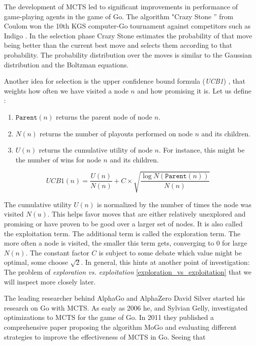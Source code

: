 The development of MCTS led to significant improvements in performance of game-playing agents in the game of Go. The algorithm "Crazy Stone '' from Coulom won the 10th KGS computer-Go tournament against competitors such as Indigo \cite{bouzy_associating_2006}. In the selection phase Crazy Stone estimates the probability of that move being better than the current best move and selects them according to that probability. The probability distribution over the moves is similar to the Gaussian distribution and the Boltzman equations. \cite[p. 4]{coulom_efficient_2007}

Another idea for selection is the upper confidence bound formula (\textit{UCB1}) \cite{auer_finite-time_nodate}, that weights how often we have visited a node $n$ and how promising it is. Let us define \cite[cf. p. 328]{russell_artificial_2021}:

\begin{enumerate}
    \item $\texttt{Parent}(n)$ returns the parent node of node $n$.
    \item $N(n) $ returns the number of playouts performed on node $n$ and its children.
    \item $U(n) $ returns the cumulative utility of node $n$. For instance, this might be the number of wins for node $n$ and its children.
\end{enumerate}

\begin{equation}
    \textit{UCB1}(n) = \frac{U(n)}{N(n)} + C \times \sqrt{\frac{\log{N(\texttt{Parent}(n))}}{N(n)}}
\end{equation}

The cumulative utility $U(n)$ is normalized by the number of times the node was visited $N(u)$. This helps favor moves that are either relatively unexplored and promising or have proven to be good over a larger set of nodes. It is also called the exploitation term. The additional term is called the exploration term. The more often a node is visited, the smaller this term gets, converging to 0 for large $N(n)$. The constant factor $C$ is subject to some debate which value might be optimal, some choose $\sqrt{2}$. In general, this hints at another point of investigation: The problem of \textit{exploration vs. exploitation} \ref{exploration_vs_exploitation} that we will inspect more closely later.

The leading researcher behind AlphaGo and AlphaZero David Silver started his research on Go with MCTS. As early as 2006 he, and Sylvian Gelly, investigated optimizations to MCTS \cite{gelly_achieving_nodate} for the game of Go. In 2011 they published a comprehensive paper \cite{gelly_monte-carlo_2011} proposing the algorithm MoGo and evaluating different strategies to improve the effectiveness of MCTS in Go. Seeing that

